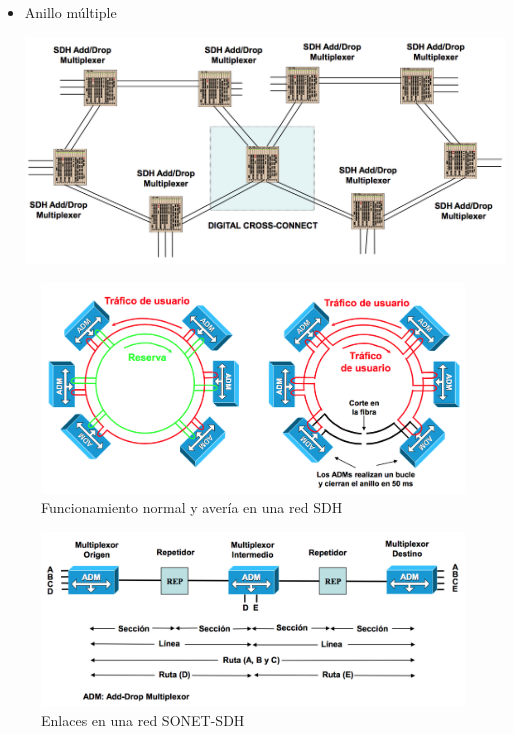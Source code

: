 \documentclass[10pt,portrait, twocolumn]{article}
\begin{document}
\begin{itemize}
\begin{center}
		\end{center}
	\item Anillo múltiple
		\begin{center}
			\includegraphics[scale=0.2]{images/AnilloMultiple}
		\end{center}
\end{itemize}

	\begin{figure}[!ht]
 		\centering
  		 \includegraphics[scale = 0.4]{images/AveriaSDH}
		\caption{Funcionamiento normal y avería en una red SDH}
	\end{figure}
	
	\begin{figure}[!ht]
 		\centering
  		 \includegraphics[scale = 0.4]{images/Enlace}
		\caption{Enlaces en una red SONET-SDH}
	\end{figure}
\end{document}
